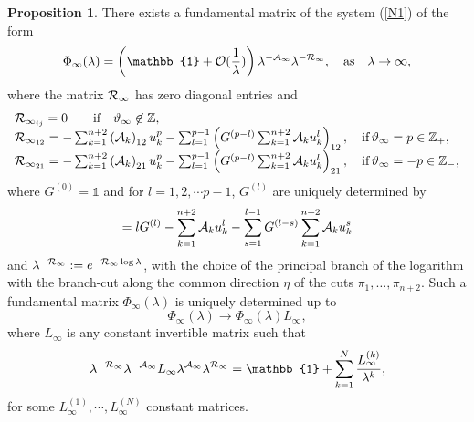 \documentclass[12pt]{article}
\def\thi{{\vartheta_\infty}}
\newcommand{\ID}{\mathbb{1}}
\newcommand {\interi}{\mathbb Z}
\theoremstyle{definition}
\theoremstyle{theorem}
\newtheorem{prop}[df]{Proposition}
\begin{document}
\begin{prop} There exists a fundamental matrix of the system 
(\ref{N1}) of the form
\begin{equation}
\Phi_\infty(\lambda)=\left(\ID +{\cal O}({1\over \lambda})\right) 
\lambda^{-{\cal A}_\infty}\lambda^{-{\cal R}_\infty},\quad\hbox{as}\quad 
\lambda\rightarrow\infty,
\label{M3}
\end{equation}
where the matrix ${\cal R}_\infty$ has zero diagonal entries and
\begin{equation}\begin{array}{l}
{\cal R}_{\infty_{ij}} = 0 \qquad \hbox{if}\quad
\thi\not\in\interi,\\
{\cal R}_{\infty_{12}} =
-\sum_{k=1}^{n+2}\left({\cal A}_k\right)_{12} u_k^p-
\sum_{l=1}^{p-1}\left(G^{(p-l)}
\sum_{k=1}^{n+2} {\cal A}_k u_k^l\right)_{12},
\quad \hbox{if}\,
\thi=p\in\interi_+,\\ 
{\cal R}_{\infty_{21}} =
-\sum_{k=1}^{n+2}\left({\cal A}_k\right)_{21} u_k^p-
\sum_{l=1}^{p-1}\left(G^{(p-l)}
\sum_{k=1}^{n+2} {\cal A}_k u_k^l\right)_{21},
\quad \hbox{if}\,
\thi=-p\in\interi_-,\\
\end{array}
\end{equation}
where $G^{(0)}=\ID$ and for $l=1,2,\cdots p-1$, $G^{(l)}$ are uniquely 
determined by
\begin{equation}
[{\cal A}_\infty,G^{(l)}]=l G^{(l)} -
\sum_{k=1}^{n+2}{\cal A}_k u_k^l-
\sum_{s=1}^{l-1} G^{(l-s)}
\sum_{k=1}^{n+2} {\cal A}_k u_k^s
\end{equation}
and $\lambda^{-{\cal R}_\infty}:=e^{-{\cal R}_\infty\log\lambda}$, with 
the choice of the principal branch of the logarithm with the
branch-cut along the common direction $\eta$ of the cuts 
$\pi_1,\dots,\pi_{n+2}$. Such a fundamental matrix 
$\Phi_\infty(\lambda)$ is uniquely determined up to 
\begin{equation}
\Phi_\infty(\lambda)\to \Phi_\infty(\lambda)L_\infty,
\label{amb}
\end{equation}
where $L_\infty$ is any constant invertible matrix such that 
\begin{equation}
\lambda^{-{\cal R}_\infty}\lambda^{-{\cal A}_\infty}L_\infty
\lambda^{{\cal A}_\infty}\lambda^{{\cal R}_\infty}=
\ID + \sum_{k=1}^N {L_\infty^{(k)}\over\lambda^k},
\label{amb1}
\end{equation}
for some $L_\infty^{(1)},\cdots,L_\infty^{(N)}$ constant matrices.
\label{prop1}\end{prop}
\end{document}
